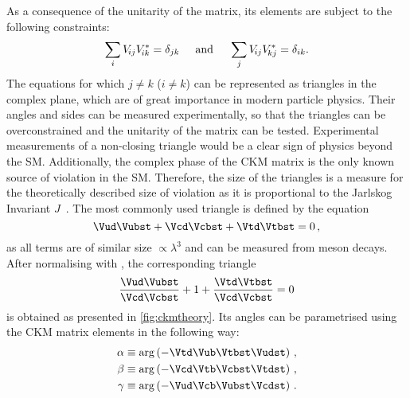 As a consequence of the unitarity of the matrix, its elements are subject to the following constraints:
\begin{equation}
\sum_{i} V_{{\kern -0.1em}ij}V_{{\kern -0.1em}ik}^{*} = \delta_{jk}\hspace{0.5cm}\text{and}\hspace{0.5cm}
\sum_{j} V_{{\kern -0.1em}ij}V_{{\kern -0.1em}kj}^{*} = \delta_{ik}\label{eq:CKMtriangleEquations}.
\end{equation}
The equations for which $j\!\neq\!k$ ($i\!\neq\!k$) can be represented as triangles in the complex plane, which are of great importance in modern particle physics.
Their angles and sides can be measured experimentally, so that the triangles can be overconstrained and the unitarity of the matrix can be tested.
Experimental measurements of a non-closing triangle would be a clear sign of physics beyond the \ac{SM}.
Additionally, the complex phase of the CKM matrix is the only known source of \mbox{\CP violation} in the \ac{SM}.
Therefore, the size of the triangles is a measure for the theoretically described size of \mbox{\CP violation} as it is proportional to the Jarlskog Invariant $J$~\cite{PhysRevLett.55.1039}.
The most commonly used triangle is defined by the equation
\begin{equation}
\Vud\Vubst + \Vcd\Vcbst + \Vtd\Vtbst = 0\,,
\end{equation}
as all terms are of similar size $\propto\lambda^3$ and can be measured from \B meson decays.
After normalising with \Vcd\Vcbst, the corresponding triangle
\begin{equation}
\frac{\Vud\Vubst}{\Vcd\Vcbst} + 1 + \frac{\Vtd\Vtbst}{\Vcd\Vcbst} = 0 \label{eq:CKMtriangle}
\end{equation}
is obtained as presented in \cref{fig:ckmtheory}.
Its angles can be parametrised using the CKM matrix elements in the following way:
\begin{equation}
\begin{aligned}
\alpha&\equiv\arg\left(-\Vtd\Vub\Vtbst\Vudst\right)\,,\\
\beta&\equiv\arg\left(-\Vcd\Vtb\Vcbst\Vtdst\right)\,,\\
\gamma&\equiv\arg\left(-\Vud\Vcb\Vubst\Vcdst\right)\,.\label{eq:CKMangles}
\end{aligned}
\end{equation}
